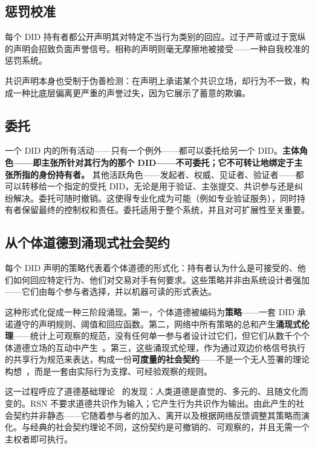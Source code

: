 \documentclass[11pt,a4paper,twocolumn]{article}
\begin{document}
\subsection{惩罚校准}

每个 DID 持有者都公开声明其对特定不当行为类别的回应。过于严苛或过于宽纵的声明会招致负面声誉信号。相称的声明则毫无摩擦地被接受——一种自我校准的惩罚系统。

共识声明本身也受制于伪善检测：在声明上承诺某个共识立场，却行为不一致，构成一种比底层偏离更严重的声誉过失，因为它展示了蓄意的欺骗。

\subsection{委托}

一个 DID 内的所有活动——只有一个例外——都可以委托给另一个 DID。\textbf{主体角色——即主张所针对其行为的那个 DID——不可委托；它不可转让地绑定于主张所指的身份持有者。} 其他活跃角色——发起者、权威、见证者、验证者——都可以转移给一个指定的受托 DID，无论是用于验证、主张提交、共识参与还是纠纷解决。委托可随时撤销。这使得专业化成为可能（例如专业验证服务），同时持有者保留最终的控制权和责任。委托适用于整个系统，并且对可扩展性至关重要。

\subsection{从个体道德到涌现式社会契约}

每个 DID 声明的策略代表着个体道德的形式化：持有者认为什么是可接受的、他们如何回应特定行为、他们对交易对手有何要求。这些策略并非由系统设计者强加——它们由每个参与者选择，并以机器可读的形式表达。

这种形式化促成一种三阶段涌现。第一，个体道德被编码为\textbf{策略}——一套 DID 承诺遵守的声明规则、阈值和回应函数。第二，网络中所有策略的总和产生\textbf{涌现式伦理}——统计上可观察的规范，没有任何单一参与者设计过它们，但它们从数千个个体道德立场的互动中产生~\cite{durkheim1893}。第三，这些涌现式伦理，作为通过双边价格信号执行的共享行为规范来表达，构成一份\textbf{可度量的社会契约}——不是一个无人签署的理论构想~\cite{rawls1971}，而是一套由实际行为支撑、可经验观察的规则。

这一过程呼应了道德基础理论~\cite{haidt2012} 的发现：人类道德是直觉的、多元的、且随文化而变的。RSN 不要求道德共识作为输入；它产生行为共识作为输出。由此产生的社会契约并非静态——它随着参与者的加入、离开以及根据网络反馈调整其策略而演化。与经典的社会契约理论不同，这份契约是可撤销的、可观察的，并且无需一个主权者即可执行。
\end{document}
